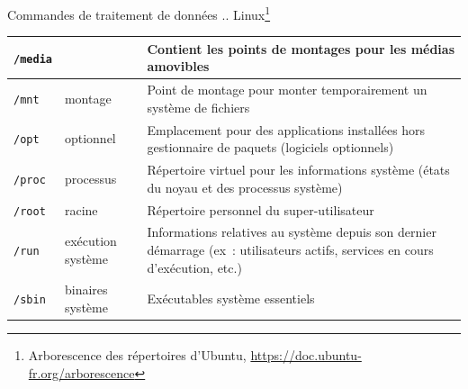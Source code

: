 \documentclass{beamer}
\begin{document}
\begin{frame}{Commandes de traitement de données}{ ..
    Linux\footnote{\label{arborescence-linux}Arborescence des répertoires d’Ubuntu, \url{https://doc.ubuntu-fr.org/arborescence}}}
\begin{tiny}
\begin{table}[h!]
\begin{tabular}{|l|p{3cm}|p{6cm}|}
                    \hline
                    \lstinline{/media}  &                                      & Contient les points de montages pour les médias amovibles                                                                      \\
                    \hline
                    \lstinline{/mnt}    & montage                              & Point de montage pour monter temporairement un système de fichiers                                                             \\
                    \hline
                    \lstinline{/opt}    & optionnel                            & Emplacement pour des applications installées hors gestionnaire de paquets (logiciels optionnels)                               \\
                    \hline
                    \lstinline{/proc}   & processus                            & Répertoire virtuel pour les informations système (états du noyau et des processus système)                                     \\
                    \hline
                    \lstinline{/root}   & racine                               & Répertoire personnel du super-utilisateur                                                                                      \\
                    \hline
                    \lstinline{/run}    & exécution système                    & Informations relatives au système depuis son dernier démarrage (ex~: utilisateurs actifs, services en cours d'exécution, etc.) \\
                    \hline
                    \lstinline{/sbin}   & binaires système                     & Exécutables système essentiels                                                                                                 \\
                    \hline
                \end{tabular}
            \end{table}
        \end{tiny}
    \end{frame}
\end{document}
